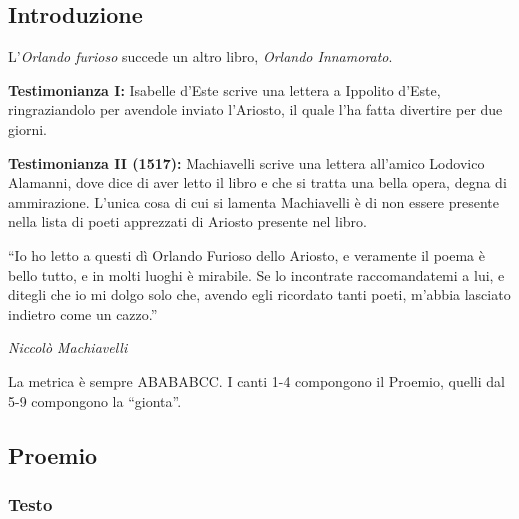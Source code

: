 \documentclass[a4paper]{article}
\newcommand{\quotes}[1]{``#1''}
\begin{document}
\subsection{Introduzione}

L'\textit{Orlando furioso} succede un altro libro,
\textit{Orlando Innamorato}.

\textbf{Testimonianza I:} Isabelle d'Este scrive una lettera a Ippolito d'Este,
ringraziandolo per avendole inviato l'Ariosto, il quale l'ha fatta
divertire per due giorni.

\textbf{Testimonianza II (1517):}  Machiavelli scrive una lettera all'amico
Lodovico Alamanni, dove dice di aver letto il libro e
che si tratta una bella opera, degna di ammirazione.
L'unica cosa di cui si lamenta Machiavelli è di non essere presente nella lista di
poeti apprezzati di Ariosto presente nel libro.

\epigraph{\quotes{Io ho letto a questi dì Orlando Furioso dello Ariosto, e veramente il poema è bello tutto, e in molti luoghi è mirabile. Se lo incontrate raccomandatemi a lui, e ditegli che io mi dolgo solo che, avendo egli ricordato tanti poeti, m'abbia lasciato indietro come un cazzo.}}
{\textit{Niccolò Machiavelli}}


La metrica è sempre ABABABCC.
I canti 1-4 compongono il Proemio, quelli dal 5-9 compongono la \quotes{gionta}.

\pagebreak

\subsection{Proemio}

\subsubsection{Testo}


\begin{center}
\begin{minipage}{0.5\textwidth}
\centering
{}
\end{minipage}
\end{center}
\end{document}
